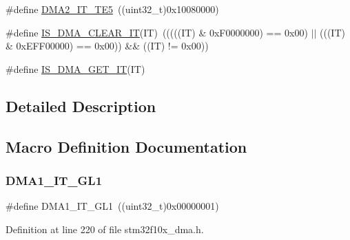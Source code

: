 \begin{DoxyCompactItemize}
\item 
\#define \hyperlink{group___d_m_a__interrupts__definition_gad47115e9a4d0d3f5d9101097983b5525}{D\+M\+A2\+\_\+\+I\+T\+\_\+\+T\+E5}~((uint32\+\_\+t)0x10080000)
\item 
\#define \hyperlink{group___d_m_a__interrupts__definition_ga390481b083355ed774b04f70a42f0dfb}{I\+S\+\_\+\+D\+M\+A\+\_\+\+C\+L\+E\+A\+R\+\_\+\+IT}(IT)~(((((IT) \& 0x\+F0000000) == 0x00) $\vert$$\vert$ (((\+I\+T) \& 0x\+E\+F\+F00000) == 0x00)) \&\& ((\+I\+T) != 0x00))
\item 
\#define \hyperlink{group___d_m_a__interrupts__definition_gaaafa1bd74bc5e78e276c731faa8eed22}{I\+S\+\_\+\+D\+M\+A\+\_\+\+G\+E\+T\+\_\+\+IT}(IT)
\end{DoxyCompactItemize}


\subsection{Detailed Description}


\subsection{Macro Definition Documentation}
\mbox{\label{group___d_m_a__interrupts__definition_ga017d35f4f6fbf5689ef39af7227bc5b0}} 
\subsubsection{\texorpdfstring{D\+M\+A1\+\_\+\+I\+T\+\_\+\+G\+L1}{DMA1\_IT\_GL1}}
{\footnotesize\ttfamily \#define D\+M\+A1\+\_\+\+I\+T\+\_\+\+G\+L1~((uint32\+\_\+t)0x00000001)}



Definition at line 220 of file stm32f10x\+\_\+dma.\+h.

\mbox{\label{group___d_m_a__interrupts__definition_ga183f3044b39da5e3b3c688239086f836}} 
